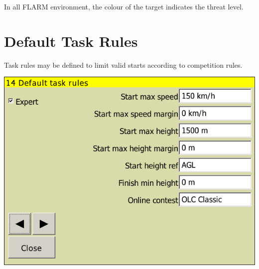 \documentclass[a4paper,12pt]{refrep}
\begin{document}
In all FLARM environment, the colour of the target indicates the threat level.


\clearpage
\section{Default Task Rules}
Task rules may be defined to limit valid starts according to competition
rules. \label{conf:taskrules}

\begin{center}
\includegraphics[angle=0,width=0.8\linewidth,keepaspectratio='true']{figures/config-rules.png}
\end{center}
\end{document}
